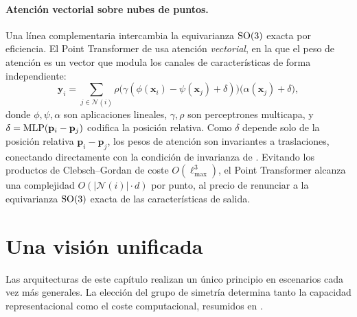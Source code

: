 \paragraph{Atenci\'on vectorial sobre nubes de puntos.}
Una l\'inea complementaria intercambia la equivarianza $\operatorname{SO}(3)$ exacta por
eficiencia. El Point Transformer de \citet{zhao2021point} usa atenci\'on
\emph{vectorial}, en la que el peso de atenci\'on es un vector que modula los
canales de caracter\'isticas de forma independiente:
\begin{equation}
  \mathbf{y}_i = \sum_{j \in \mathcal{N}(i)}
    \rho\big(\gamma(\phi(\mathbf{x}_i) - \psi(\mathbf{x}_j) + \delta)\big)
    \big(\alpha(\mathbf{x}_j) + \delta\big),
\end{equation}
donde $\phi, \psi, \alpha$ son aplicaciones lineales, $\gamma, \rho$ son
perceptrones multicapa, y $\delta = \operatorname{MLP}(\mathbf{p}_i - \mathbf{p}_j)$ codifica
la posici\'on relativa. Como $\delta$ depende solo de la posici\'on relativa
$\mathbf{p}_i - \mathbf{p}_j$, los pesos de atenci\'on son invariantes a
traslaciones, conectando directamente con la condici\'on de invarianza de
. Evitando los productos de
Clebsch--Gordan de coste $O(\ell_{\max}^3)$, el Point Transformer alcanza una
complejidad $O(|\mathcal{N}(i)| \cdot d)$ por punto, al precio de renunciar a la
equivarianza $\operatorname{SO}(3)$ exacta de las caracter\'isticas de salida.

\section{Una visi\'on unificada}
\label{sec:groups:unified}

Las arquitecturas de este cap\'itulo realizan un \'unico principio en escenarios
cada vez m\'as generales. La elecci\'on del grupo de simetr\'ia determina tanto la
capacidad representacional como el coste computacional, resumidos en
.

